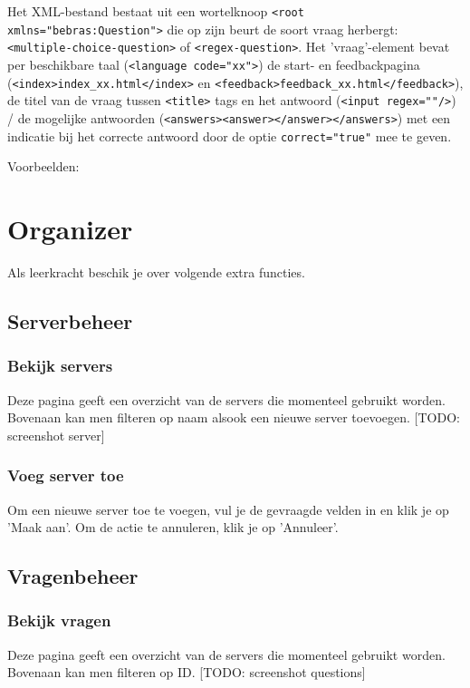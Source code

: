 \documentclass[]{article}
\begin{document}
Het XML-bestand bestaat uit een wortelknoop \verb+<root xmlns="bebras:Question">+ 
die op zijn beurt de soort vraag herbergt: \verb+<multiple-choice-question>+ of \verb+<regex-question>+.
Het 'vraag'-element bevat per beschikbare taal (\verb+<language code="xx">+) 
de start- en feedbackpagina (\verb+<index>index_xx.html</index>+ en \verb+<feedback>feedback_xx.html</feedback>+), 
de titel van de vraag tussen \verb+<title>+ tags 
en het antwoord (\verb+<input regex=""/>+) / de mogelijke antwoorden (\verb+<answers><answer></answer></answers>+)
met een indicatie bij het correcte antwoord door de optie \verb+correct="true"+ mee te geven.

Voorbeelden:

 

\section{Organizer}

Als leerkracht beschik je over volgende extra functies.

\subsection{Serverbeheer}

\subsubsection{Bekijk servers}
Deze pagina geeft een overzicht van de servers die momenteel gebruikt worden. Bovenaan kan men filteren op naam alsook een nieuwe server toevoegen. [TODO: screenshot server]

\subsubsection{Voeg server toe}
Om een nieuwe server toe te voegen, vul je de gevraagde velden in en klik je op 'Maak aan'. Om de actie te annuleren, klik je op 'Annuleer'.

\subsection{Vragenbeheer}

\subsubsection{Bekijk vragen}
Deze pagina geeft een overzicht van de servers die momenteel gebruikt worden. Bovenaan kan men filteren op ID. [TODO: screenshot questions]
\end{document}
